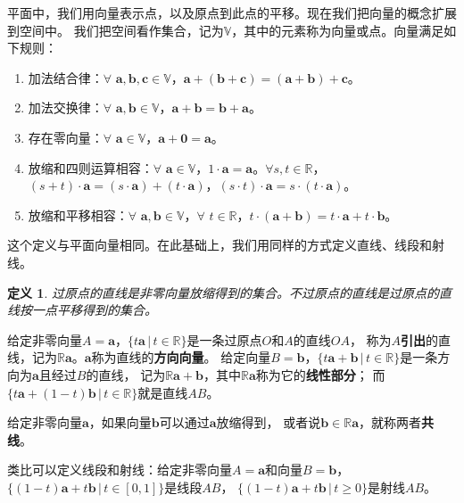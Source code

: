 \documentclass[12pt,UTF8]{ctexbook}
\newtheorem{df}{定义}[section]
\begin{document}
平面中，我们用向量表示点，以及原点到此点的平移。现在我们把向量的概念扩展到空间中。
我们把空间看作集合，记为$\mathbb{V}$，其中的元素称为向量或点。向量满足如下规则：

\begin{enumerate}
    \item 加法结合律：$\forall \,\, \mathbf{a}, \mathbf{b}, \mathbf{c} \in \mathbb{V}$，$\mathbf{a}+ (\mathbf{b} + \mathbf{c}) = (\mathbf{a} + \mathbf{b}) + \mathbf{c}$。
    \item 加法交换律：$\forall \,\, \mathbf{a}, \mathbf{b} \in \mathbb{V}$，$\mathbf{a} + \mathbf{b} = \mathbf{b} + \mathbf{a}$。
    \item 存在零向量：$\forall \,\, \mathbf{a} \in \mathbb{V}$，$\mathbf{a} + \mathbf{0} = \mathbf{a}$。
    \item 放缩和四则运算相容：$\forall \,\, \mathbf{a} \in \mathbb{V}$，$1\cdot \mathbf{a} = \mathbf{a}$。$\forall s, t \in \mathbb{R}$，$(s + t)\cdot\mathbf{a} = (s\cdot\mathbf{a}) + (t\cdot\mathbf{a})$，$(s \cdot t)\cdot \mathbf{a} = s \cdot (t\cdot \mathbf{a})$。
    \item 放缩和平移相容：$\forall \,\, \mathbf{a}, \mathbf{b} \in \mathbb{V}$，$\forall \,\, t \in \mathbb{R}$，$t\cdot(\mathbf{a} + \mathbf{b}) = t\cdot\mathbf{a} + t\cdot\mathbf{b}$。
\end{enumerate}

这个定义与平面向量相同。在此基础上，我们用同样的方式定义直线、线段和射线。
\begin{df}
    过原点的直线是非零向量放缩得到的集合。不过原点的直线是过原点的直线按一点平移得到的集合。
\end{df}
给定非零向量$A = \mathbf{a}$，$ \{t\mathbf{a} \, | \, t\in\mathbb{R}\}$是一条过原点$O$和$A$的直线$OA$，
称为$A$\textbf{引出}的直线，记为$\mathbb{R}\mathbf{a}$。$\mathbf{a}$称为直线的\textbf{方向向量}。
给定向量$B = \mathbf{b}$，$ \{t\mathbf{a}+\mathbf{b} \, | \, t\in\mathbb{R}\}$是一条方向为$\mathbf{a}$且经过$B$的直线，
记为$\mathbb{R}\mathbf{a}+\mathbf{b}$，其中$\mathbb{R}\mathbf{a}$称为它的\textbf{线性部分}；
而$ \{t\mathbf{a}+(1 - t)\mathbf{b} \, | \, t\in\mathbb{R}\}$就是直线$AB$。

给定非零向量$\mathbf{a}$，如果向量$\mathbf{b}$可以通过$\mathbf{a}$放缩得到，
或者说$\mathbf{b}\in \mathbb{R}\mathbf{a}$，就称两者\textbf{共线}。

类比可以定义线段和射线：给定非零向量$A = \mathbf{a}$和向量$B =\mathbf{b}$，
$ \{(1 - t)\mathbf{a}+t\mathbf{b} \, | \, t\in [0, 1]\}$是线段$AB$，
$ \{(1 - t)\mathbf{a}+t\mathbf{b} \, | \, t \geqslant 0 \}$是射线$AB$。
\end{document}
